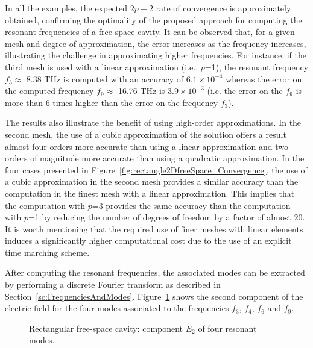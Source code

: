 In all the examples, the expected $2p+2$ rate of convergence is approximately obtained, confirming the optimality of the proposed approach for computing the resonant frequencies of a free-space cavity. It can be observed that, for a given mesh and degree of approximation, the error increases as the frequency increases, illustrating the challenge in approximating higher frequencies. For instance, if the third mesh is used with a linear approximation (i.e., $p$=1), the resonant frequency $f_3 \approx$  8.38 THz is computed with an accuracy of $6.1 \times 10^{-4}$ whereas the error on the computed frequency $f_9 \approx$ 16.76 THz is $3.9 \times 10^{-3}$ (i.e. the error on the $f_9$ is more than 6 times higher than the error on the frequency $f_3$).

The results also illustrate the benefit of using high-order approximations. In the second mesh, the use of a cubic approximation of the solution offers a result almost four orders more accurate than using a linear approximation and two orders of magnitude more accurate than using a quadratic approximation. In the four cases presented in Figure~\ref{fig:rectangle2DfreeSpace_Convergence}, the use of a cubic approximation in the second mesh provides a similar accuracy than the computation in the finest mesh with a linear approximation. This implies that the computation with $p$=3 provides the same accuracy than the computation with $p$=1 by reducing the number of degrees of freedom by a factor of almost 20. It is worth mentioning that the required use of finer meshes with linear elements induces a significantly higher computational cost due to the use of an explicit time marching scheme.

After computing the resonant frequencies, the associated modes can be extracted by performing a discrete Fourier transform as described in Section~\ref{sc:FrequenciesAndModes}. Figure~\ref{fig:rectangle2DfreeSpace_modes} shows the second component of the electric field for the four modes associated to the frequencies $f_3$, $f_4$, $f_6$ and $f_9$.
\begin{figure}[!ht]
	\centering
	\caption{Rectangular free-space cavity: component $E_2$ of four resonant modes.}
	\label{fig:rectangle2DfreeSpace_modes}
\end{figure}

